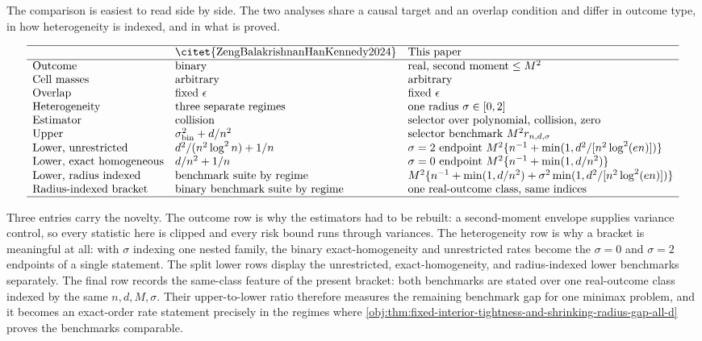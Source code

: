 The comparison is easiest to read side by side. The two analyses share a causal target and an overlap condition and differ in outcome type, in how heterogeneity is indexed, and in what is proved.

\[
\begin{array}{lll}
\hline
 & \text{\citet{ZengBalakrishnanHanKennedy2024}} & \text{This paper}\\
\hline
\text{Outcome} & \text{binary} & \text{real, second moment} \le M^2\\
\text{Cell masses} & \text{arbitrary} & \text{arbitrary}\\
\text{Overlap} & \text{fixed }\epsilon & \text{fixed }\epsilon\\
\text{Heterogeneity} & \text{three separate regimes} & \text{one radius }\sigma\in[0,2]\\
\text{Estimator} & \text{collision} & \text{selector over polynomial, collision, zero}\\
\text{Upper} & \sigma_{\mathrm{bin}}^2+d/n^2 & \text{selector benchmark }M^2 r_{n,d,\sigma}\\
\text{Lower, unrestricted} & d^2/(n^2\log^2 n)+1/n & \sigma=2\text{ endpoint }M^2\{n^{-1}+\min(1,d^2/[n^2\log^2(en)])\}\\
\text{Lower, exact homogeneous} & d/n^2+1/n & \sigma=0\text{ endpoint }M^2\{n^{-1}+\min(1,d/n^2)\}\\
\text{Lower, radius indexed} & \text{benchmark suite by regime} & M^2\{n^{-1}+\min(1,d/n^2)+\sigma^2\min(1,d^2/[n^2\log^2(en)])\}\\
\text{Radius-indexed bracket} & \text{binary benchmark suite by regime} & \text{one real-outcome class, same indices}\\
\hline
\end{array}
\]

Three entries carry the novelty. The outcome row is why the estimators had to be rebuilt: a second-moment envelope supplies variance control, so every statistic here is clipped and every risk bound runs through variances. The heterogeneity row is why a bracket is meaningful at all: with \(\sigma\) indexing one nested family, the binary exact-homogeneity and unrestricted rates become the \(\sigma=0\) and \(\sigma=2\) endpoints of a single statement. The split lower rows display the unrestricted, exact-homogeneity, and radius-indexed lower benchmarks separately. The final row records the same-class feature of the present bracket: both benchmarks are stated over one real-outcome class indexed by the same \(n,d,M,\sigma\). Their upper-to-lower ratio therefore measures the remaining benchmark gap for one minimax problem, and it becomes an exact-order rate statement precisely in the regimes where \cref{obj:thm:fixed-interior-tightness-and-shrinking-radius-gap-all-d} proves the benchmarks comparable.


